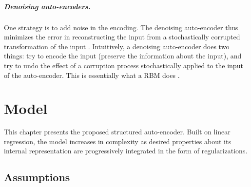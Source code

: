 \paragraph{Denoising auto-encoders.}
One strategy is to add noise in the encoding. The denoising auto-encoder thus minimizes the error in reconstructing the input from a stochastically corrupted transformation of the input \cite{bengio2008denoisingAutoencoders}. Intuitively, a denoising auto-encoder does two things: try to encode the input (preserve the information about the input), and try to undo the effect of a corruption process stochastically applied to the input of the auto-encoder. This is essentially what a \gls{RBM} does \cite{hinton2002RBM}.




\chapter{Model} \label{chap:model}

This chapter presents the proposed structured auto-encoder. Built on linear regression, the model increases in complexity as desired properties about its internal representation are progressively integrated in the form of regularizations.


\section{Assumptions} \label{sec:assumptions}

